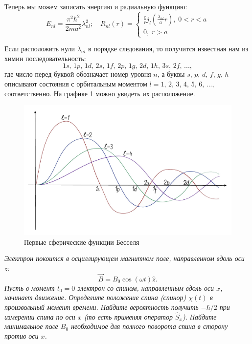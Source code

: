 Теперь мы можем записать энергию и радиальную функцию:
\[
E_{nl} = \frac{\pi^2\hbar^2}{2ma^2}\lambda_{nl}^2;\quad R_{nl}(r) =
\begin{cases}
    \frac{c}{r}j_{l}\left( \frac{\lambda_{nl}}{a}r \right), \; 0 < r < a\\
    0, \; r > a
\end{cases}
\]

Если расположить нули $\lambda_{nl}$ в порядке следования, то получится известная нам из химии последовательность:
\[
1s,\,1p,\,1d,\,2s,\,1f,\,2p,\,1g,\,2d,\,1h,\,3s,\,2f,\, ...,
\]
где число перед буквой обозначает номер уровня $n$, а буквы $s,\,p,\,d,\,f,\,g,\,h$ описывают состояния с орбитальным моментом $l=1,\,2,\,3,\,4,\,5,\,6,\,...$, соответственно. На графике \ref{fig 10.1} можно увидеть их расположение.

\begin{figure}[h!]
\centering
\includegraphics[scale=0.28]{class_10/images/bessel.jpg}
\caption{Первые сферические функции Бесселя}
\label{fig 10.1}
\end{figure}



\begin{center}
    \textit{Электрон покоится в осциллирующем магнитном поле, направленном вдоль оси z:}
    \[
    \vec{B} = B_0\cos(\omega t)\hat{z}.
    \]
    \textit{Пусть в момент $t_0 = 0$ электрон со спином, направленным вдоль оси $x$, начинает движение. Определите положение спина (спинор) $\chi(t)$ в произвольный момент времени. Найдите вероятность получить $-\hbar/2$ при измерении спина по оси $x$ (то есть применяя оператор $\hat{S}_x$). Найдите минимальное поле $B_0$ необходимое для полного поворота спина в сторону против оси $x$.}
\end{center}

